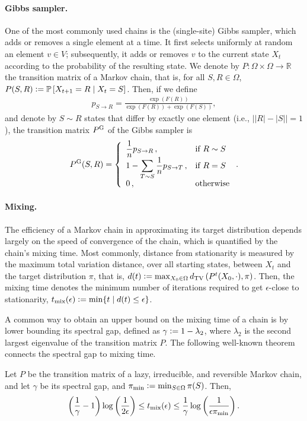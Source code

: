 \paragraph{Gibbs sampler.}
One of the most commonly used chains is the (single-site) Gibbs sampler, which adds or removes a single element %
at a time.
It first selects uniformly at random an element $v \in V$; subsequently, it adds or removes $v$ to the current state $X_t$ according to the probability of the resulting state.
We denote by $P : \Omega \times \Omega \to \mathbb{R}$ the transition matrix of a Markov chain, that is, for all $S, R \in \Omega$, $P(S, R) \vcentcolon= \mathbb{P}\left[ X_{t+1} = R \mid X_t = S \right]$.
Then, if we define
\begin{align*}
p_{S \rightarrow R} = \displaystyle\frac{\exp(F(R))}{\exp(F(R)) + \exp(F(S))},
\end{align*}
and denote by $S \sim R$ states that differ by exactly one element (i.e., $\big||R| - |S|\big| = 1$),
the transition matrix $P^{\mathrm{G}}$ of the Gibbs sampler is
\begin{align*}
  P^{\mathrm{G}}(S, R) = 
  \left\{ \begin{array}{ll} \displaystyle\frac{1}{n}p_{S \rightarrow R}\,,& \mbox{if } R \sim S \\ 1 - \displaystyle\sum_{T \sim S} \displaystyle\frac{1}{n}p_{S \rightarrow T}\,,& \mbox{if } R = S \\ 0\,,& \mbox{otherwise} \end{array} \right..
\end{align*}

\paragraph{Mixing.}
The efficiency of a Markov chain in approximating its target distribution depends largely on the speed of convergence of the chain, which is quantified by the chain's mixing time.
Most commonly, distance from stationarity is measured by the maximum total variation distance, over all starting states, between $X_t$ and the target distribution $\pi$, that is, $d(t) \vcentcolon= \max_{X_0 \in \Omega} d_{\textrm{TV}}\left( P^t(X_0, \cdot), \pi \right)$.
Then, the mixing time denotes the minimum number of iterations required to get $\epsilon$-close to stationarity, $t_{\mathrm{mix}}(\epsilon) \vcentcolon= \min \{ t \mid d(t) \leq \epsilon \}$.

A common way to obtain an upper bound on the mixing time of a chain is by lower bounding its spectral gap, defined as $\gamma \vcentcolon= 1 - \lambda_2$, where $\lambda_2$ is the second largest eigenvalue of the transition matrix $P$.
The following well-known theorem connects the spectral gap to mixing time.
\begin{theorem} \label{thm:spectral}
  Let $P$ be the transition matrix of a lazy, irreducible, and reversible Markov chain, and let $\gamma$ be its spectral gap, and $\pi_{\textrm{min}} \vcentcolon= \min_{S \in \Omega} \pi(S)$. Then,
  \begin{align*}
    \left( \frac{1}{\gamma} - 1 \right)\log\left( \frac{1}{2\epsilon} \right) \leq t_{\mathrm{mix}}(\epsilon) \leq \frac{1}{\gamma} \log\left( \frac{1}{\epsilon\pi_{\textrm{min}}} \right).
  \end{align*}
\end{theorem}

